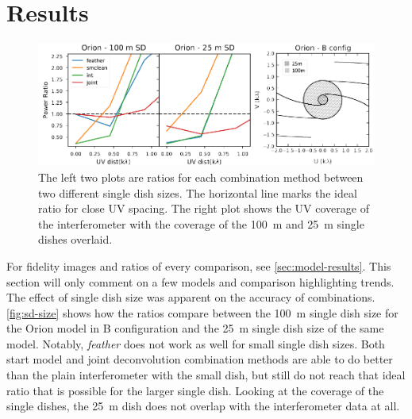 \documentclass[manuscript,linenumbers]{aastex62}
\begin{document}

\section{Results}

\begin{figure}[ht]
    \includegraphics[width=\textwidth]{figures/sd_size_comp}
    \caption{The left two plots are ratios for each combination method between two different single dish sizes. The horizontal line marks the ideal ratio for close UV spacing. The right plot shows the UV coverage of the interferometer with the coverage of the \SI{100}{\meter} and \SI{25}{\meter} single dishes overlaid.}
    \label{fig:sd-size}
\end{figure}

For fidelity images and ratios of every comparison, see \autoref{sec:model-results}. This section will only comment on a few models and comparison highlighting trends. The effect of single dish size was apparent on the accuracy of combinations. \autoref{fig:sd-size} shows how the ratios compare between the \SI{100}{\meter} single dish size for the Orion model in B configuration and the \SI{25}{\meter} single dish size of the same model. Notably, \textit{feather} does not work as well for small single dish sizes. Both start model and joint deconvolution combination methods are able to do better than the plain interferometer with the small dish, but still do not reach that ideal ratio that is possible for the larger single dish. Looking at the coverage of the single dishes, the \SI{25}{\meter} dish does not overlap with the interferometer data at all.
\end{document}
